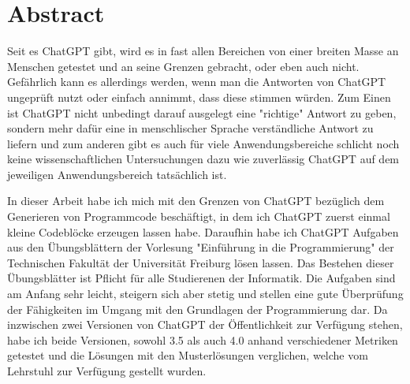 \documentclass[class=scrbook, crop=false]{standalone}
\begin{document}
\chapter*{Abstract}
\label{ch:abstract}
{
    \setlength{\parindent}{2em}
    \setlength{\parskip}{0em}

    Seit es ChatGPT gibt, wird es in fast allen Bereichen von einer breiten Masse an Menschen getestet und an seine Grenzen gebracht, oder eben auch nicht.
    Gefährlich kann es allerdings werden, wenn man die Antworten von ChatGPT ungeprüft nutzt oder einfach annimmt, dass diese stimmen würden.
    Zum Einen ist ChatGPT nicht unbedingt darauf ausgelegt eine "richtige" Antwort zu geben, sondern mehr dafür eine in menschlischer Sprache verständliche
    Antwort zu liefern und zum anderen gibt es auch für viele Anwendungsbereiche schlicht noch keine wissenschaftlichen
    Untersuchungen dazu wie zuverlässig ChatGPT auf dem jeweiligen Anwendungsbereich tatsächlich ist.

    In dieser Arbeit habe ich mich mit den Grenzen von ChatGPT bezüglich dem Generieren von Programmcode beschäftigt,
    in dem ich ChatGPT zuerst einmal kleine Codeblöcke erzeugen lassen habe.
    Daraufhin habe ich ChatGPT Aufgaben aus den Übungsblättern der Vorlesung "Einführung in die Programmierung" der Technischen
    Fakultät der Universität Freiburg lösen lassen. Das Bestehen dieser Übungsblätter ist Pflicht für alle Studierenen der
    Informatik. Die Aufgaben sind am Anfang sehr leicht, steigern sich aber stetig und stellen eine gute Überprüfung der
    Fähigkeiten im Umgang mit den Grundlagen der Programmierung dar.
    Da inzwischen zwei Versionen von ChatGPT der Öffentlichkeit zur Verfügung stehen, habe ich beide Versionen, sowohl
    3.5 als auch 4.0 anhand verschiedener Metriken getestet und die Lösungen mit den Musterlösungen verglichen, welche
    vom Lehrstuhl zur Verfügung gestellt wurden.
}
\end{document}
